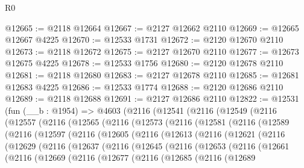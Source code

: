 \begin{lexlean}{R0}
\begin{coremodule}
@12665 := @2118 @12664
@12667 := @2127 @12662 @2110
@12669 := @12665 @12667 @4225
@12670 := @12533 @1731
@12672 := @2120 @12670 @2110
@12673 := @2118 @12672
@12675 := @2127 @12670 @2110
@12677 := @12673 @12675 @4225
@12678 := @12533 @1756
@12680 := @2120 @12678 @2110
@12681 := @2118 @12680
@12683 := @2127 @12678 @2110
@12685 := @12681 @12683 @4225
@12686 := @12533 @1774
@12688 := @2120 @12686 @2110
@12689 := @2118 @12688
@12691 := @2127 @12686 @2110
@12822 := @12531
    (fun (__b : @1954) =>
    @4603
      (@2116
        (@12541
          (@2116
            (@12549
              (@2116
                (@12557
                  (@2116
                    (@12565
                      (@2116
                        (@12573
                          (@2116
                            (@12581
                              (@2116
                                (@12589
                                  (@2116
                                    (@12597
                                      (@2116
                                        (@12605
                                          (@2116
                                            (@12613
                                              (@2116
                                                (@12621
                                                  (@2116
                                                    (@12629
                                                      (@2116
                                                        (@12637
                                                          (@2116
                                                            (@12645
                                                              (@2116
                                                                (@12653
                                                                  (@2116
                                                                    (@12661
                                                                      (@2116
                                                                        (@12669
                                                                          (@2116
                                                                            (@12677
                                                                              (@2116
                                                                                (@12685
                                                                                  (@2116
                                                                                    (@12689

\end{coremodule}
\end{lexlean}
